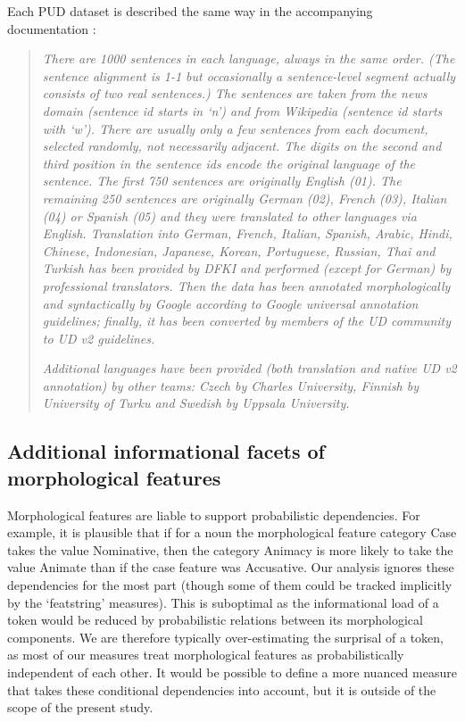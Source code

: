 \documentclass[USenglish]{article}
\begin{document}
Each PUD dataset is described the same way in the accompanying documentation \citep{UD_2.14}:
\begin{quote}
    
\textit{
There are 1000 sentences in each language, always in the same order. (The sentence alignment is 1-1 but occasionally a sentence-level segment actually consists of two real sentences.) The sentences are taken from the news domain (sentence id starts in ‘n’) and from Wikipedia (sentence id starts with ‘w’). There are usually only a few sentences from each document, selected randomly, not necessarily adjacent. The digits on the second and third position in the sentence ids encode the original language of the sentence. The first 750 sentences are originally English (01). The remaining 250 sentences are originally German (02), French (03), Italian (04) or Spanish (05) and they were translated to other languages via English. Translation into German, French, Italian, Spanish, Arabic, Hindi, Chinese, Indonesian, Japanese, Korean, Portuguese, Russian, Thai and Turkish has been provided by DFKI and performed (except for German) by professional translators. Then the data has been annotated morphologically and syntactically by Google according to Google universal annotation guidelines; finally, it has been converted by members of the UD community to UD v2 guidelines.}

\textit{
Additional languages have been provided (both translation and native UD v2 annotation) by other teams: Czech by Charles University, Finnish by University of Turku and Swedish by Uppsala University.}

\end{quote}

\FloatBarrier
\subsection{Additional informational facets of morphological features}
\label{caveat_conditional_order}
Morphological features are liable to support probabilistic dependencies.
For example, it is plausible that if for a noun the morphological feature category Case takes the value Nominative, then the category Animacy is more likely to take the value Animate than if the case feature was Accusative.
Our analysis ignores these dependencies for the most part (though some of them could be tracked implicitly by the `featstring' measures).
This is suboptimal as the informational load of a token would be reduced by probabilistic relations between its morphological components.
We are therefore typically over-estimating the surprisal of a token, as most of our measures treat morphological features as probabilistically independent of each other.
It would be possible to define a more nuanced measure that takes these conditional dependencies into account, but it is outside of the scope of the present study.
\end{document}
